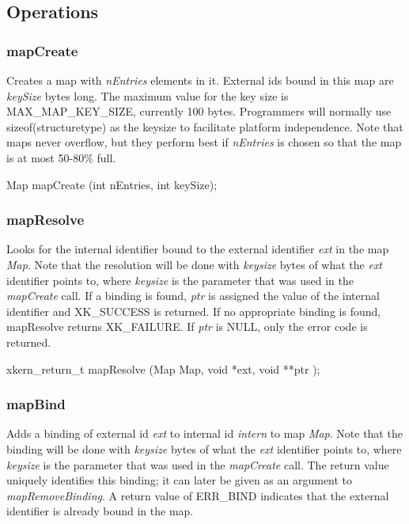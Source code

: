 \subsection{Operations}

\subsubsection{mapCreate}

Creates a map with {\em nEntries} elements in it. External ids bound
in this map are {\em keySize} bytes long. The maximum value for the
key size is MAX\_MAP\_KEY\_SIZE, currently 100 bytes.  Programmers will
normally use {\sf sizeof(structuretype)} as the keysize to facilitate
platform independence.  Note that maps never overflow, but they
perform best if {\em nEntries} is chosen so that the map is at most
50-80\% full.
\medskip

{\sem Map } {\bold mapCreate} ({\sem int} {\caps nEntries}, {\sem int} {\caps keySize});

\subsubsection{mapResolve}

Looks for the internal identifier bound to the external identifier
{\em ext} in the map {\em Map}.  Note that the resolution will be done
with {\em keysize} bytes of what the {\em ext} identifier points to,
where {\em keysize} is the parameter that was used in the {\em
mapCreate} call.  If a binding is found, {\em *ptr} is assigned the
value of the internal identifier and XK\_SUCCESS is returned.  If no
appropriate binding is found, mapResolve returns XK\_FAILURE.  If {\em
ptr} is NULL, only the error code is returned.
\medskip

{\sem xkern\_return\_t} {\bold mapResolve} ({\sem Map} {\caps Map}, 
{\sem void} *{\caps ext}, 
{\sem void} **{\caps ptr} );

\subsubsection{mapBind}

Adds a binding of external id {\em ext} to internal id {\em intern}
to map {\em Map}.  Note that the binding will be done with {\em
keysize} bytes of what the {\em ext} identifier points to, where {\em
keysize} is the parameter that was used in the {\em mapCreate} call.
The return value uniquely identifies this binding; it can later be
given as an argument to {\em mapRemoveBinding}.  
A return
value of ERR\_BIND indicates that the external identifier is already
bound in the map.
\medskip

